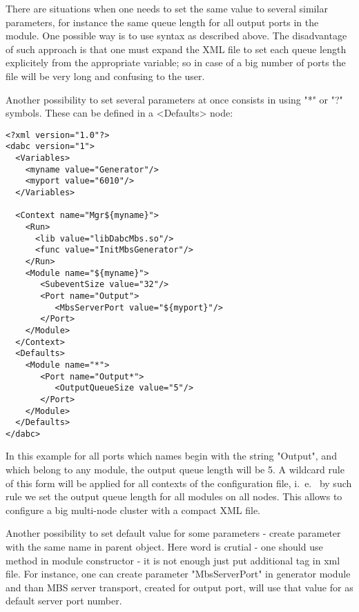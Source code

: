 There are situations when one needs to set the same value to several similar parameters,
for instance the same queue length for all output ports in the module. 
One possible way is to use syntax as described above. 
The disadvantage of such approach is that one must expand the XML file
to set each queue length explicitely from the appropriate variable;
so in case of a big number of ports the file will be very long and 
confusing to the user.

Another possibility to set several parameters at once 
consists in  using "*" or "?" symbols.
These can be defined in a  <Defaults> node: 

\begin{small}
\begin{verbatim}
<?xml version="1.0"?>
<dabc version="1">
  <Variables>
    <myname value="Generator"/> 
    <myport value="6010"/> 
  </Variables>

  <Context name="Mgr${myname}">
    <Run>
      <lib value="libDabcMbs.so"/>
      <func value="InitMbsGenerator"/>
    </Run>
    <Module name="${myname}">
       <SubeventSize value="32"/>
       <Port name="Output">
          <MbsServerPort value="${myport}"/>
       </Port>
    </Module>
  </Context>
  <Defaults>
    <Module name="*">
       <Port name="Output*">
          <OutputQueueSize value="5"/>
       </Port>
    </Module>
  </Defaults>
</dabc>
\end{verbatim}
\end{small}

In this example for all ports which names begin with the string "Output", 
and which belong to any module, the output queue length will be 5. 
A wildcard rule of this form will be applied for 
all contexts of the configuration file, 
i.~e.~ by such rule we set the output queue length for all modules on all nodes. 
This allows to configure a big multi-node cluster with
a compact XML file.

Another possibility to set default value for some parameters - create
parameter with the same name in parent object. Here word  
is crutial - one should use  method in module constructor - 
it is not enough just put additional tag in xml file. For instance, one can
create parameter "MbsServerPort" in generator module and than 
MBS server transport, created for output port, will use that value for 
as default server port number.  



